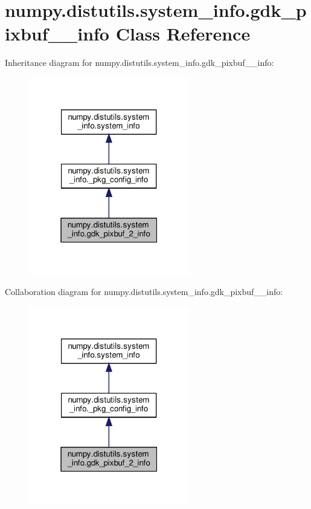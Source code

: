 \hypertarget{classnumpy_1_1distutils_1_1system__info_1_1gdk__pixbuf__2__info}{}\section{numpy.\+distutils.\+system\+\_\+info.\+gdk\+\_\+pixbuf\+\_\+\_\+info Class Reference}
\label{classnumpy_1_1distutils_1_1system__info_1_1gdk__pixbuf__2__info}


Inheritance diagram for numpy.\+distutils.\+system\+\_\+info.\+gdk\+\_\+pixbuf\+\_\+\_\+info\+:
\nopagebreak
\begin{figure}[H]
\begin{center}
\leavevmode
\includegraphics[width=199pt]{classnumpy_1_1distutils_1_1system__info_1_1gdk__pixbuf__2__info__inherit__graph}
\end{center}
\end{figure}


Collaboration diagram for numpy.\+distutils.\+system\+\_\+info.\+gdk\+\_\+pixbuf\+\_\+\_\+info\+:
\nopagebreak
\begin{figure}[H]
\begin{center}
\leavevmode
\includegraphics[width=199pt]{classnumpy_1_1distutils_1_1system__info_1_1gdk__pixbuf__2__info__coll__graph}
\end{center}
\end{figure}
